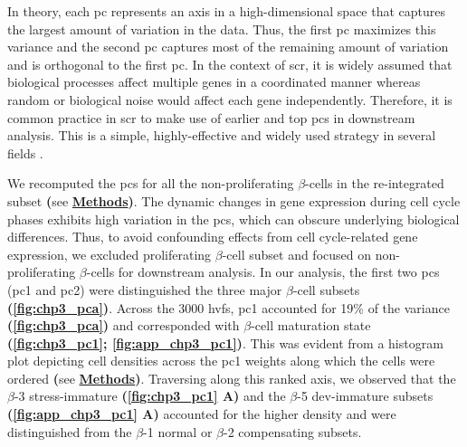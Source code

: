 \par In theory, each \acrfull{pc} represents an axis in a high-dimensional space that captures the largest amount of variation in the data. Thus, the first \gls{pc} maximizes this variance and the second \gls{pc} captures most of the remaining amount of variation and is orthogonal to the first \gls{pc}. In the context of \gls{scr}, it is widely assumed that biological processes affect multiple genes in a coordinated manner whereas random or biological noise would affect each gene independently. Therefore, it is common practice in \gls{scr} to make use of earlier and top \glspl{pc} in downstream analysis. This is a simple, highly-effective and widely used strategy in several fields \textbf{\cite{noauthor_dimensionality_nodate}}.\\




\par We recomputed the \glspl{pc} for all the non-proliferating $\beta$-cells in the re-integrated subset \textbf{(}see \hyperref[subsubsec:met_chp3_pca]{\textbf{Methods}}\textbf{)}. The dynamic changes in gene expression during cell cycle phases exhibits high variation in the \glspl{pc}, which can obscure underlying biological differences. Thus, to avoid confounding effects from cell cycle-related gene expression, we excluded proliferating $\beta$-cell subset and focused on non-proliferating $\beta$-cells for downstream analysis. In our analysis, the first two \glspl{pc} (\gls{pc}1 and \gls{pc}2) were distinguished the three major $\beta$-cell subsets \textbf{(\autoref{fig:chp3_pca})}. Across the 3000 \glspl{hvf}, \gls{pc}1 accounted for 19\% of the variance \textbf{(\autoref{fig:chp3_pca})} and corresponded with $\beta$-cell maturation state \textbf{(\autoref{fig:chp3_pc1}; \autoref{fig:app_chp3_pc1})}. This was evident from a histogram plot depicting cell densities across the \gls{pc}1 weights along which the cells were ordered \textbf{(}see \hyperref[subsubsec:met_chp3_pca]{\textbf{Methods}}\textbf{)}. Traversing along this ranked axis, we observed that the $\beta$-3 stress-immature \textbf{(\autoref{fig:chp3_pc1} A)} and the $\beta$-5 dev-immature subsets \textbf{(\autoref{fig:app_chp3_pc1} A)} accounted for the higher density and were distinguished from the $\beta$-1 normal or $\beta$-2 compensating subsets.\\


